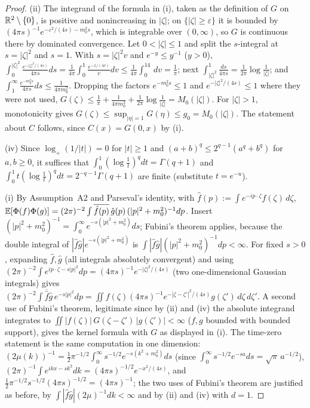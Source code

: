 \begin{proof}
(ii) The integrand of the formula in (i), taken as the definition of $G$ on
$\mathbb{R}^2\setminus\{0\}$, is positive and nonincreasing in $|\zeta|$; on $\{|\zeta|\ge\varepsilon\}$
it is bounded by $(4\pi s)^{-1}e^{-\varepsilon^2/(4s)-m_0^2s}$, which is integrable over
$(0,\infty)$, so $G$ is continuous there by dominated convergence. Let $0<|\zeta|\le1$ and split
the $s$-integral at $s=|\zeta|^2$ and $s=1$. With $s=|\zeta|^2v$ and $e^{-y}\le y^{-1}$
($y>0$),
$\int_0^{|\zeta|^2}\frac{e^{-|\zeta|^2/(4s)}}{4\pi s}ds=\frac1{4\pi}\int_0^1\frac{e^{-1/(4v)}}{v}dv
\le\frac1{4\pi}\int_0^14\,dv=\frac1\pi$; next
$\int_{|\zeta|^2}^1\frac{ds}{4\pi s}=\frac1{2\pi}\log\frac1{|\zeta|}$; and
$\int_1^\infty\frac{e^{-m_0^2s}}{4\pi s}ds\le\frac1{4\pi m_0^2}$. Dropping the factors
$e^{-m_0^2s}\le1$ and $e^{-|\zeta|^2/(4s)}\le1$ where they were not used,
$G(\zeta)\le\frac1\pi+\frac1{4\pi m_0^2}+\frac1{2\pi}\log\frac1{|\zeta|}=M_0(|\zeta|)$. For
$|\zeta|>1$, monotonicity gives $G(\zeta)\le\sup_{|\eta|=1}G(\eta)\le g_0=M_0(|\zeta|)$. The
statement about $C$ follows, since $C(x)=G(0,x)$ by (i).

(iv) Since $\log_+(1/|t|)=0$ for $|t|\ge1$ and $(a+b)^q\le2^{q-1}(a^q+b^q)$ for $a,b\ge0$, it
suffices that $\int_0^1(\log\frac1t)^qdt=\Gamma(q+1)$ and
$\int_0^1t(\log\frac1t)^qdt=2^{-q-1}\Gamma(q+1)$ are finite (substitute $t=e^{-u}$).

(i) By Assumption~A2 and Parseval's identity, with $\hat f(p):=\int e^{-ip\cdot\zeta}f(\zeta)\,d\zeta$,
$\mathbb{E}[\Phi(f)\Phi(g)]=(2\pi)^{-2}\int\overline{\hat f(p)}\,\hat g(p)\,(|p|^2+m_0^2)^{-1}dp$.
Insert $(|p|^2+m_0^2)^{-1}=\int_0^\infty e^{-s(|p|^2+m_0^2)}ds$; Fubini's theorem applies,
because the double integral of $|\hat f\hat g|e^{-s(|p|^2+m_0^2)}$ is
$\int|\hat f\hat g|(|p|^2+m_0^2)^{-1}dp<\infty$. For fixed $s>0$, expanding $\hat f,\hat g$
(all integrals absolutely convergent) and using
$(2\pi)^{-2}\int e^{ip\cdot\zeta-s|p|^2}dp=(4\pi s)^{-1}e^{-|\zeta|^2/(4s)}$ (two
one-dimensional Gaussian integrals) gives
$(2\pi)^{-2}\int\overline{\hat f}\hat g\,e^{-s|p|^2}dp
=\iint f(\zeta)(4\pi s)^{-1}e^{-|\zeta-\zeta'|^2/(4s)}g(\zeta')\,d\zeta\,d\zeta'$. A second use
of Fubini's theorem, legitimate since by (ii) and (iv) the absolute integrand integrates to
$\iint|f(\zeta)|\,G(\zeta-\zeta')\,|g(\zeta')|<\infty$ ($f,g$ bounded with bounded support),
gives the kernel formula with $G$ as displayed in (i). The time-zero statement is the same
computation in one dimension: $(2\mu(k))^{-1}=\frac12\pi^{-1/2}\int_0^\infty
s^{-1/2}e^{-s(k^2+m_0^2)}ds$ (since $\int_0^\infty s^{-1/2}e^{-sa}ds=\sqrt\pi\,a^{-1/2}$),
$(2\pi)^{-1}\int e^{ikx-sk^2}dk=(4\pi s)^{-1/2}e^{-x^2/(4s)}$, and
$\frac12\pi^{-1/2}s^{-1/2}(4\pi s)^{-1/2}=(4\pi s)^{-1}$; the two uses of Fubini's theorem are
justified as before, by $\int|\hat f\hat g|(2\mu)^{-1}dk<\infty$ and by (ii) and (iv) with
$d=1$.


\end{proof}
